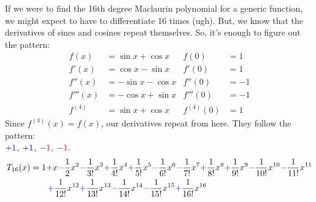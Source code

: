 \begin{solution}
If we were to find the 16th degree Maclaurin polynomial for a generic function, we might expect to have to differentiate 16 times (ugh). But, we know that the derivatives of sines and cosines repeat themselves. So, it's enough to figure out the pattern:
\begin{align*}
f(x)&=\sin x + \cos x & f(0)&=1\\
f'(x)&=\cos x - \sin x & f'(0)&=1\\
f''(x)&=-\sin x - \cos x & f''(0)&=-1\\
f'''(x)&=-\cos x +\sin x & f'''(0)&=-1\\
f^{(4)}&=\sin x + \cos x & f^{(4)}(0)&=1
\end{align*}
Since $f^{(4)}(x)=f(x)$, our derivatives repeat from here. They follow the pattern:\\ $\textcolor{blue}{+1}$, $\textcolor{blue}{+1}$, $\textcolor{red}{-1}$, $\textcolor{red}{-1}$.
\begin{align*}
T_{16}(x)&=1\textcolor{blue}{+}x
\textcolor{red}{-}\frac{1}{2}x^2
\textcolor{red}{-}\frac{1}{3!}x^3
\textcolor{blue}{+}\frac{1}{4!}x^4
\textcolor{blue}{+}\frac{1}{5!}x^5
\textcolor{red}{-}\frac{1}{6!}x^6
\textcolor{red}{-}\frac{1}{7!}x^7
\textcolor{blue}{+}\frac{1}{8!}x^8
\textcolor{blue}{+}\frac{1}{9!}x^9
\textcolor{red}{-}\frac{1}{10!}x^{10}
\textcolor{red}{-}\frac{1}{11!}x^{11}\\
&\qquad\textcolor{blue}{+}\frac{1}{12!}x^{12}
\textcolor{blue}{+}\frac{1}{13!}x^{13}
\textcolor{red}{-}\frac{1}{14!}x^{14}
\textcolor{red}{-}\frac{1}{15!}x^{15}
\textcolor{blue}{+}\frac{1}{16!}x^{16}
\end{align*}
\end{solution}




